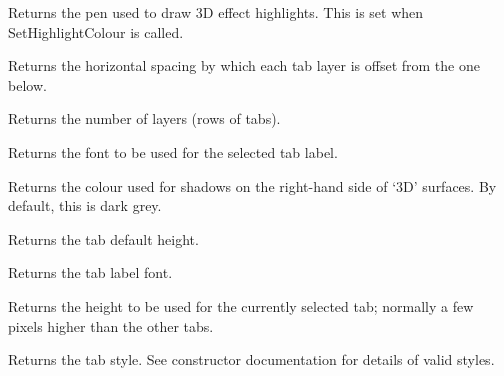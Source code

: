 

Returns the pen used to draw 3D effect highlights. This is set when
SetHighlightColour is called. 



Returns the horizontal spacing by which each tab layer is offset from the one below.



Returns the number of layers (rows of tabs).



Returns the font to be used for the selected tab label.



Returns the colour used for shadows on the right-hand side of `3D' surfaces. By default, this is dark grey.



Returns the tab default height.



Returns the tab label font.



Returns the height to be used for the currently selected tab; normally a few pixels
higher than the other tabs.



Returns the tab style. See constructor documentation for details of valid styles.



